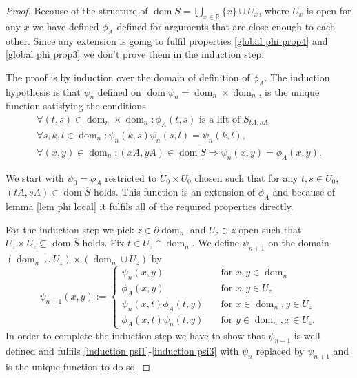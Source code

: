 \documentclass[b5paper,draft,openbib,12pt]{memoir}
\DeclareMathOperator{\dom}{dom}
\begin{document}
\begin{proof}

 
Because of the structure of \(\dom\overline{S}=\bigcup_{x\in\mathbb{R}} \{x\} \cup U_x\), where \(U_x\) is open for any \(x\) 
we have defined \(\phi_A\) defined for arguments that are
close enough to each other. Since any extension is going to fulfil properties \eqref{global phi prop4} and \eqref{global phi prop3} 
we don't prove them in the induction step.





The proof is by induction over the domain of definition of \(\phi_A\). 
The induction hypothesis is that \(\psi_n\) defined
 on  \(\dom \psi_n=\dom_n \times\dom_n\), is the unique function satisfying the conditions
 \begin{align}\label{induction psi1}
 \forall (t,s)\in \dom_n\times \dom_n: \phi_A(t,s) \text{ is a lift of } S_{tA, sA}\\\label{induction psi2}
\forall s,k,l\in\dom_n: \psi_n(k,s)\psi_n(s,l)=\psi_n(k,l),\\\label{induction psi3}
\forall (x,y)\in\dom_n: (xA, yA)\in\dom\overline{S}\Rightarrow  \psi_n(x,y)=\phi_A(x,y).
\end{align}

We start with \(\psi_0=\phi_A\)  
restricted to \(U_0 \times U_0\) chosen such that for any \(t,s\in U_0\), \((t A, s A)\in\dom\overline{S}\) holds. 
 This function is an extension of \(\phi_A\) and because of lemma \ref{lem phi local} it 
 fulfils all of the required properties directly. 
 
For the induction step we pick \(z\in \partial \dom_n\) and \(U_z\ni z\) open such that \(U_z\times U_z \subseteq \dom\overline{S}\) holds.
Fix \(t\in U_z\cap \dom_n\).
 We define \(\psi_{n+1}\) on the domain \((\dom_n\cup U_z)\times (\dom_n\cup U_z)\) by
 \begin{equation}\label{psi induction def}
 \psi_{n+1}(x,y):=\left\{\begin{matrix}
 \psi_n(x,y) \quad &\text{for }x,y\in \dom_n\\
 \phi_A(x,y) \quad &\text{for } x,y\in U_z\\
 \psi_n(x,t)\phi_A(t,y)\quad &\text{for } x\in \dom_n, y\in U_z\\
 \phi_A(x,t)\psi_n(t,y)\quad &\text{for } y\in \dom_n, x\in U_z.
 \end{matrix} \right.
 \end{equation} 
  In order to complete the induction step we have to show that \(\psi_{n+1}\) is well defined and fulfils \eqref{induction psi1}-\eqref{induction psi3} 
  with \(\psi_n\) replaced by \(\psi_{n+1}\)  and is the unique function to do so.
  

\end{proof}
\end{document}
